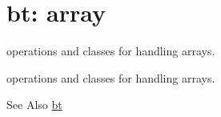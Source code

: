 \hypertarget{group__array}{\section{bt\-: array}
\label{group__array}
}


operations and classes for handling arrays.  


operations and classes for handling arrays. \begin{DoxySeeAlso}{See Also}
\hyperlink{namespacebt}{bt} 
\end{DoxySeeAlso}
